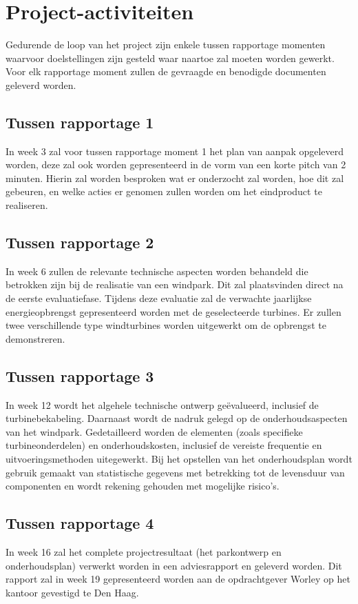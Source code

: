 \section{Project-activiteiten}
Gedurende de loop van het project zijn enkele tussen rapportage momenten waarvoor doelstellingen zijn gesteld waar naartoe zal moeten worden gewerkt. Voor elk rapportage moment zullen de gevraagde en benodigde documenten geleverd worden.

\subsection{Tussen rapportage 1}
In week 3 zal voor tussen rapportage moment 1 het plan van aanpak opgeleverd worden, deze zal ook worden gepresenteerd in de vorm van een korte pitch van 2 minuten. Hierin zal worden besproken wat er onderzocht zal worden, hoe dit zal gebeuren, en welke acties er genomen zullen worden om het eindproduct te realiseren.

\subsection{Tussen rapportage 2}
In week 6 zullen de relevante technische aspecten worden behandeld die betrokken zijn bij de realisatie van een windpark. Dit zal plaatsvinden direct na de eerste evaluatiefase. Tijdens deze evaluatie zal de verwachte jaarlijkse energieopbrengst gepresenteerd worden met de geselecteerde turbines. Er zullen twee verschillende type windturbines worden uitgewerkt om de opbrengst te demonstreren.

\subsection{Tussen rapportage 3}
In week 12 wordt het algehele technische ontwerp geëvalueerd, inclusief de turbinebekabeling. Daarnaast wordt de nadruk gelegd op de onderhoudsaspecten van het windpark. Gedetailleerd worden de elementen (zoals specifieke turbineonderdelen) en onderhoudskosten, inclusief de vereiste frequentie en uitvoeringsmethoden uitegewerkt. Bij het opstellen van het onderhoudsplan wordt gebruik gemaakt van statistische gegevens met betrekking tot de levensduur van componenten en wordt rekening gehouden met mogelijke risico's\cite{algemene-kosten-windpark}.

\subsection{Tussen rapportage 4}
In week 16 zal het complete projectresultaat (het parkontwerp en onderhoudsplan) verwerkt worden in een adviesrapport en geleverd worden. Dit rapport zal in week 19 gepresenteerd worden aan de opdrachtgever Worley op het kantoor gevestigd te Den Haag.
